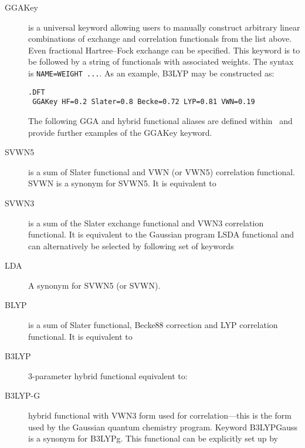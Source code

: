 \begin{description}
\begin{description}
\item[GGAKey] is a universal keyword allowing users to manually
  construct arbitrary linear combinations of exchange and correlation 
  functionals from the list above. Even fractional 
  Hartree--Fock exchange can be specified. This keyword is to be 
  followed by a string of functionals with associated weights. 
  The syntax is \verb|NAME=WEIGHT ...|. 
  As an example, B3LYP may be constructed as:
\begin{verbatim}
.DFT
 GGAKey HF=0.2 Slater=0.8 Becke=0.72 LYP=0.81 VWN=0.19
\end{verbatim}

The following GGA and hybrid functional aliases are defined within 
\lsdalton\ and provide further examples of the GGAKey keyword.

\item[SVWN5] is a sum of Slater functional and VWN (or VWN5) correlation
  functional. SVWN is a synonym for SVWN5. It is equivalent to

\item[SVWN3] is a sum of the Slater exchange functional and VWN3 correlation
  functional. It is equivalent to the Gaussian program LSDA functional 
  and can alternatively be selected by following set of keywords

\item[LDA] A synonym for SVWN5 (or SVWN). 


\item[BLYP] is a sum of Slater functional, Becke88 correction and LYP
  correlation functional.  It is equivalent to 

\item[B3LYP] 3-parameter hybrid functional \cite{dft:b3lyp} equivalent to:

\item[B3LYP-G] hybrid functional with VWN3 form used for
  correlation---this is the form used by the Gaussian quantum chemistry
  program. Keyword B3LYPGauss is a synonym for B3LYPg. 
  This functional can be explicitly set up by


\end{description}
\end{description}
